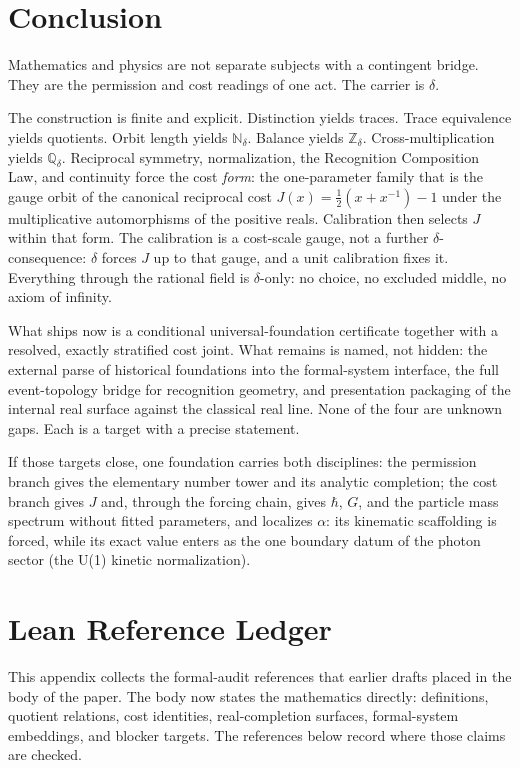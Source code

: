 \documentclass[11pt,a4paper]{article}
\theoremstyle{definition}
\theoremstyle{remark}
\begin{document}
\section{Conclusion}\label{sec:conclusion}

Mathematics and physics are not separate subjects with a contingent
bridge. They are the permission and cost readings of one act. The carrier
is $\delta$.

The construction is finite and explicit. Distinction yields traces.
Trace equivalence yields quotients. Orbit length yields $\mathbb{N}_\delta$.
Balance yields $\mathbb{Z}_\delta$. Cross-multiplication yields
$\mathbb{Q}_\delta$. Reciprocal symmetry, normalization, the Recognition
Composition Law, and continuity force the cost \emph{form}: the one-parameter
family that is the gauge orbit of the canonical reciprocal cost $J(x) =
\tfrac{1}{2}(x + x^{-1}) - 1$ under the multiplicative automorphisms of the
positive reals. Calibration then selects $J$ within that form. The calibration
is a cost-scale gauge, not a further $\delta$-consequence: $\delta$ forces $J$ up
to that gauge, and a unit calibration fixes it. Everything through the rational
field is $\delta$-only: no choice, no excluded middle, no axiom of infinity.

What ships now is a conditional universal-foundation certificate together with a
resolved, exactly stratified cost joint. What remains is named, not hidden: the
external parse of historical foundations into the
formal-system interface, the full event-topology bridge for recognition
geometry, and presentation packaging of the internal real surface against
the classical real line. None of the four are unknown gaps. Each is a
target with a precise statement.

If those targets close, one foundation carries both disciplines: the
permission branch gives the elementary number tower and its analytic
completion; the cost branch gives $J$ and, through the forcing chain,
gives $\hbar$, $G$, and the particle mass spectrum without fitted
parameters, and localizes $\alpha$: its kinematic scaffolding is forced,
while its exact value enters as the one boundary datum of the photon
sector (the U(1) kinetic normalization).

\appendix
\section{Lean Reference Ledger}\label{app:lean-refs}

This appendix collects the formal-audit references that earlier drafts
placed in the body of the paper. The body now states the mathematics directly:
definitions, quotient relations, cost identities, real-completion surfaces,
formal-system embeddings, and blocker targets. The references below record
where those claims are checked.
\end{document}
